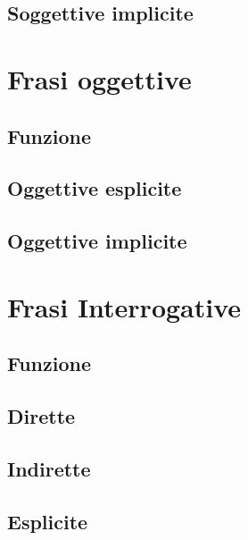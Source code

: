 \documentclass[
  a4paper,
  twoside,
  11pt,
  chapterprefix=false,
  bibliography=totocnumbered,
  listof=flat]{scrbook}
\begin{document}
\hypertarget{soggettive-implicite}{%
\section{Soggettive implicite}\label{soggettive-implicite}}

\hypertarget{frasi-oggettive}{%
\chapter{Frasi oggettive}\label{frasi-oggettive}}

\hypertarget{funzione-1}{%
\section{Funzione}\label{funzione-1}}

\hypertarget{oggettive-esplicite}{%
\section{Oggettive esplicite}\label{oggettive-esplicite}}

\hypertarget{oggettive-implicite}{%
\section{Oggettive implicite}\label{oggettive-implicite}}

\hypertarget{frasi-interrogative}{%
\chapter{Frasi Interrogative}\label{frasi-interrogative}}

\hypertarget{funzione-2}{%
\section{Funzione}\label{funzione-2}}

\hypertarget{dirette}{%
\section{Dirette}\label{dirette}}

\hypertarget{indirette-1}{%
\section{Indirette}\label{indirette-1}}

\hypertarget{esplicite}{%
\section{Esplicite}\label{esplicite}}
\end{document}
